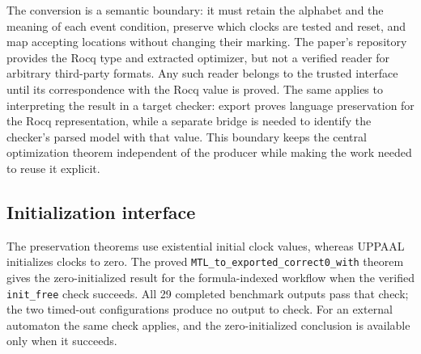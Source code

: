 \documentclass{ieeeaccess}
\begin{document}
The conversion is a semantic boundary: it must retain the alphabet and the
meaning of each event condition, preserve which clocks are tested and reset,
and map accepting locations without changing their marking. The paper's
repository provides the Rocq type and extracted optimizer, but not a verified
reader for arbitrary third-party formats. Any such reader belongs to the
trusted interface until its correspondence with the Rocq value is proved. The
same applies to interpreting the result in a target checker: export proves
language preservation for the Rocq representation, while a separate bridge is
needed to identify the checker's parsed model with that value. This boundary
keeps the central optimization theorem independent of the producer while making the
work needed to reuse it explicit.

\subsection{Initialization interface}
The preservation theorems use existential initial clock values,
whereas UPPAAL initializes clocks to zero. The proved
\texttt{MTL\_to\_exported\_correct0\_with} theorem gives the zero-initialized
result for the formula-indexed workflow when the verified
\texttt{init\_free} check succeeds. All 29 completed benchmark outputs pass
that check; the two timed-out configurations produce no output to check. For
an external automaton the same check applies, and the zero-initialized
conclusion is available only when it succeeds.
\end{document}
